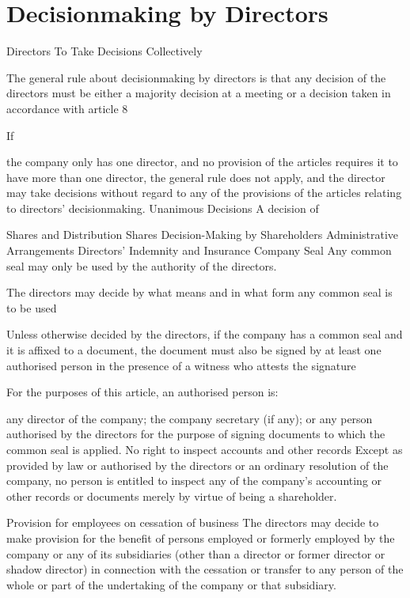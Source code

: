 \documentclass[letterpaper,10pt,english]{sphinxmanual}
\begin{document}
\section{Decisionmaking by Directors}
\label{\detokenize{content:decisionmaking-by-directors}}
Directors To Take Decisions Collectively

The general rule about decisionmaking by directors is that any decision of the directors must be either a majority decision at a meeting or a decision taken in accordance with article 8

If

the company only has one director, and
no provision of the articles requires it to have more than one director, the general rule does not apply, and the director may take decisions without regard to any of the provisions of the articles relating to directors’ decisionmaking.
Unanimous Decisions
A decision of

Shares and Distribution
Shares
Decision-Making by Shareholders
Administrative Arrangements
Directors’ Indemnity and Insurance
Company Seal
Any common seal may only be used by the authority of the directors.

The directors may decide by what means and in what form any common seal is to be used

Unless otherwise decided by the directors, if the company has a common seal and it is affixed to a document, the document must also be signed by at least one authorised person in the presence of a witness who attests the signature

For the purposes of this article, an authorised person is:

any director of the company;
the company secretary (if any); or
any person authorised by the directors for the purpose of signing documents to which the common seal is applied.
No right to inspect accounts and other records
Except as provided by law or authorised by the directors or an ordinary resolution of the company, no person is entitled to inspect any of the company’s accounting or other records or documents merely by virtue of being a shareholder.

Provision for employees on cessation of business
The directors may decide to make provision for the benefit of persons employed or formerly employed by the company or any of its subsidiaries (other than a director or former director or shadow director) in connection with the cessation or transfer to any person of the whole or part of the undertaking of the company or that subsidiary.
\end{document}
